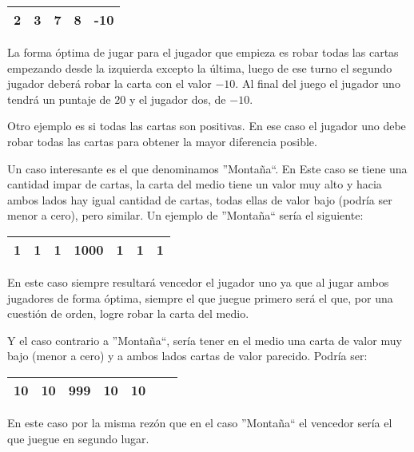 \begin{center}
\begin{tabular}{|c|c|c|c|c|}
\hline
2 & 3 & 7 & 8 & -10 \\
\hline
\end{tabular}
\end{center}

La forma óptima de jugar para el jugador que empieza es robar todas las cartas empezando desde la izquierda excepto la última, luego de ese turno el segundo jugador deberá robar la carta con el valor $-10$. Al final del juego el jugador uno tendrá un puntaje de $20$ y el jugador dos, de $-10$.

Otro ejemplo es si todas las cartas son positivas. En ese caso el jugador uno debe robar todas las cartas para obtener la mayor diferencia posible.

Un caso interesante es el que denominamos ''Montaña``. En Este caso se tiene una cantidad impar de cartas, la carta del medio tiene un valor muy alto y hacia ambos lados hay igual cantidad de cartas, todas ellas de valor bajo (podría ser menor a cero), pero similar. Un ejemplo de ''Montaña`` sería el siguiente:

\begin{center}
\begin{tabular}{|c|c|c|c|c|c|c|}
\hline
1 &1 & 1 & 1000 & 1 & 1 & 1 \\
\hline
\end{tabular}
\end{center}

En este caso siempre resultará vencedor el jugador uno ya que al jugar ambos jugadores de forma óptima, siempre el que juegue primero será el que, por una cuestión de orden, logre robar la carta del medio.

Y el caso contrario a ''Montaña``, sería tener en el medio una carta de valor muy bajo (menor a cero) y a ambos lados cartas de valor parecido. Podría ser:

\begin{center}
\begin{tabular}{|c|c|c|c|c|c|c|}
\hline
10 & 10 & 999 & 10 & 10 \\
\hline
\end{tabular}
\end{center}

En este caso por la misma rezón que en el caso ''Montaña`` el vencedor sería el que juegue en segundo lugar.